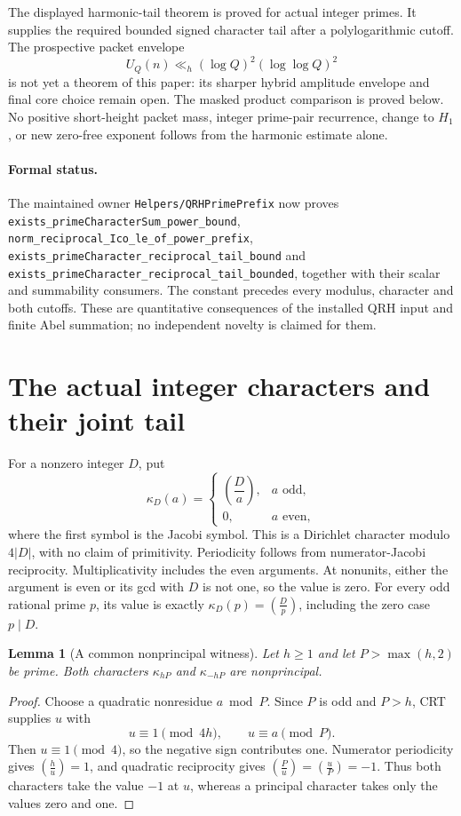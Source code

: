 \documentclass[11pt]{article}
\newtheorem{lemma}[theorem]{Lemma}
\begin{document}
The displayed harmonic-tail theorem is proved for actual integer primes.
It supplies the required bounded signed character tail after a
polylogarithmic cutoff. The prospective packet envelope
\[
                U_Q(n)\ll_h(\log Q)^2(\log\log Q)^2
\]
is not yet a theorem of this paper: its sharper hybrid amplitude envelope
and final core choice remain open. The masked product comparison is proved below.
No positive short-height packet mass,
integer prime-pair recurrence, change to \(H_1\), or new zero-free
exponent follows from the harmonic estimate alone.

\paragraph{Formal status.}
The maintained owner \texttt{Helpers/QRHPrimePrefix} now proves
\texttt{exists\_primeCharacterSum\_power\_bound},
\texttt{norm\_reciprocal\_Ico\_le\_of\_power\_prefix},
\texttt{exists\_primeCharacter\_reciprocal\_tail\_bound} and
\texttt{exists\_primeCharacter\_reciprocal\_tail\_bounded},
together with their scalar and summability consumers.
The constant precedes every modulus, character and both cutoffs.
These are quantitative consequences of the installed QRH input and
finite Abel summation; no independent novelty is claimed for them.

\section{The actual integer characters and their joint tail}
For a nonzero integer \(D\), put
\[
 \kappa_D(a)=
 \begin{cases}
  \left(\dfrac{D}{a}\right),&a\text{ odd},\\
  0,&a\text{ even},
 \end{cases}
\]
where the first symbol is the Jacobi symbol.
This is a Dirichlet character modulo \(4|D|\), with no claim of
primitivity. Periodicity follows from numerator-Jacobi reciprocity.
Multiplicativity includes the even arguments. At nonunits, either the
argument is even or its gcd with \(D\) is not one, so the value is zero.
For every odd rational prime \(p\), its value is exactly
\(\kappa_D(p)=\left(\frac Dp\right)\), including the zero case \(p\mid D\).

\begin{lemma}[A common nonprincipal witness]\label{lem:integer-character-prime-factor}
Let \(h\geq1\) and let \(P>\max(h,2)\) be prime. Both characters
\(\kappa_{hP}\) and \(\kappa_{-hP}\) are nonprincipal.
\end{lemma}
\begin{proof}
Choose a quadratic nonresidue \(a\bmod P\).
Since \(P\) is odd and \(P>h\), CRT supplies \(u\) with
\[
                     u\equiv1\pmod{4h},\qquad u\equiv a\pmod P.
\]
Then \(u\equiv1\pmod4\), so the negative sign contributes one.
Numerator periodicity gives \(\left(\frac hu\right)=1\), and
quadratic reciprocity gives
\(\left(\frac Pu\right)=\left(\frac uP\right)=-1\).
Thus both characters take the value \(-1\) at \(u\), whereas a principal
character takes only the values zero and one.
\end{proof}
\end{document}
